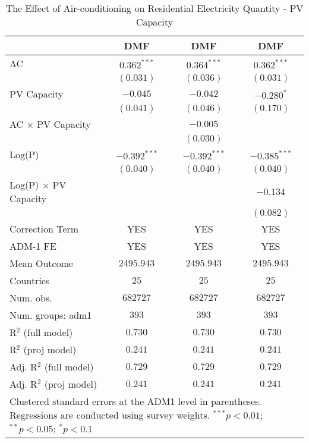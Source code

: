 
\begin{table}[htbp]
\caption{The Effect of Air-conditioning on Residential Electricity Quantity - PV Capacity}
\begin{center}
\begin{tabular}{l c c c}
\hline
 & DMF & DMF & DMF \\
\hline
AC                          & $0.362^{***}$  & $0.364^{***}$  & $0.362^{***}$  \\
                            & $(0.031)$      & $(0.036)$      & $(0.031)$      \\
PV Capacity                 & $-0.045$       & $-0.042$       & $-0.280^{*}$   \\
                            & $(0.041)$      & $(0.046)$      & $(0.170)$      \\
AC $\times$ PV Capacity     &                & $-0.005$       &                \\
                            &                & $(0.030)$      &                \\
Log(P)                      & $-0.392^{***}$ & $-0.392^{***}$ & $-0.385^{***}$ \\
                            & $(0.040)$      & $(0.040)$      & $(0.040)$      \\
Log(P) $\times$ PV Capacity &                &                & $-0.134$       \\
                            &                &                & $(0.082)$      \\
\hline
Correction Term             & YES            & YES            & YES            \\
ADM-1 FE                    & YES            & YES            & YES            \\
Mean Outcome                & $2495.943$     & $2495.943$     & $2495.943$     \\
Countries                   & $25$           & $25$           & $25$           \\
Num. obs.                   & $682727$       & $682727$       & $682727$       \\
Num. groups: adm1           & $393$          & $393$          & $393$          \\
R$^2$ (full model)          & $0.730$        & $0.730$        & $0.730$        \\
R$^2$ (proj model)          & $0.241$        & $0.241$        & $0.241$        \\
Adj. R$^2$ (full model)     & $0.729$        & $0.729$        & $0.729$        \\
Adj. R$^2$ (proj model)     & $0.241$        & $0.241$        & $0.241$        \\
\hline
\multicolumn{4}{l}{\scriptsize{Clustered standard errors at the ADM1 level in parentheses. Regressions are conducted using survey weights. $^{***}p<0.01$; $^{**}p<0.05$; $^{*}p<0.1$}}
\end{tabular}
\label{main: tableA7}
\end{center}
\end{table}
